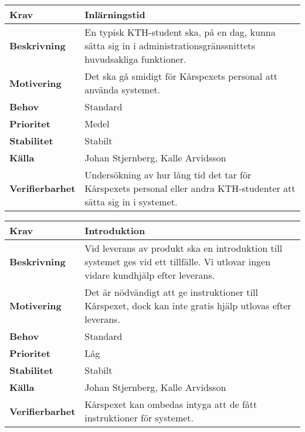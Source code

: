 \documentclass[a4paper, twoside, 11pt, titlepage]{article}
\begin{document}
		\begin{tabular} { p{2.6cm} p{12.5cm} }
			\hline
			\sffamily\textbf{Krav} & Inlärningstid  \\
			\hline
			\sffamily\textbf{Beskrivning} & En typisk KTH-student ska, på en dag, kunna sätta sig in i administrationsgränssnittets huvudsakliga funktioner.  \\
			\hline
			\sffamily\textbf{Motivering} & Det ska gå smidigt för Kårspexets personal att använda systemet.  \\
			\hline
			\sffamily\textbf{Behov} & Standard  \\
			\hline
			\sffamily\textbf{Prioritet} & Medel  \\
			\hline
			\sffamily\textbf{Stabilitet} & Stabilt  \\
			\hline
			\sffamily\textbf{Källa} & Johan Stjernberg, Kalle Arvidsson  \\
			\hline
			\sffamily\textbf{Verifierbarhet} & Undersökning av hur lång tid det tar för Kårspexets personal eller andra KTH-studenter att sätta sig in i systemet.  \\
			\hline
		\end{tabular}
		\vspace{6mm}

		\begin{tabular} { p{2.6cm} p{12.5cm} }
			\hline
			\sffamily\textbf{Krav} & Introduktion  \\
			\hline
			\sffamily\textbf{Beskrivning} & Vid leverans av produkt ska en introduktion till systemet ges vid ett tillfälle. Vi utlovar ingen vidare kundhjälp efter leverans.  \\
			\hline
			\sffamily\textbf{Motivering} & Det är nödvändigt att ge instruktioner till Kårspexet, dock kan inte gratis hjälp utlovas efter leverans.  \\
			\hline
			\sffamily\textbf{Behov} & Standard  \\
			\hline
			\sffamily\textbf{Prioritet} & Låg  \\
			\hline
			\sffamily\textbf{Stabilitet} & Stabilt  \\
			\hline
			\sffamily\textbf{Källa} & Johan Stjernberg, Kalle Arvidsson  \\
			\hline
			\sffamily\textbf{Verifierbarhet} & Kårspexet kan ombedas intyga att de fått instruktioner för systemet.  \\
			\hline
		\end{tabular}
		\vspace{6mm}
\end{document}
